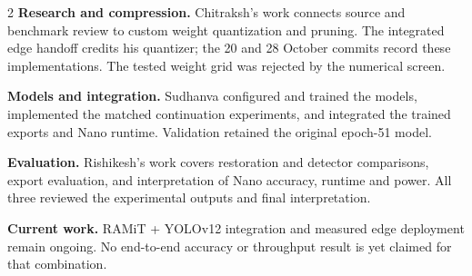 \begin{multicols}{2}\raggedcolumns
\textbf{Research and compression.} Chitraksh's work connects source and
benchmark review to custom weight quantization and pruning. The integrated
edge handoff credits his quantizer; the 20 and 28 October commits record
these implementations. The tested weight grid was rejected by the numerical
screen.

\textbf{Models and integration.} Sudhanva configured and trained the models,
implemented the matched continuation experiments, and integrated the trained
exports and Nano runtime. Validation retained the original epoch-51 model.

\textbf{Evaluation.} Rishikesh's work covers restoration and detector
comparisons, export evaluation, and interpretation of Nano accuracy,
runtime and power. All three reviewed the experimental outputs and final
interpretation.

\textbf{Current work.} RAMiT + YOLOv12 integration and measured edge deployment
remain ongoing. No end-to-end accuracy or throughput result is yet claimed
for that combination.
\end{multicols}
\clearpage
